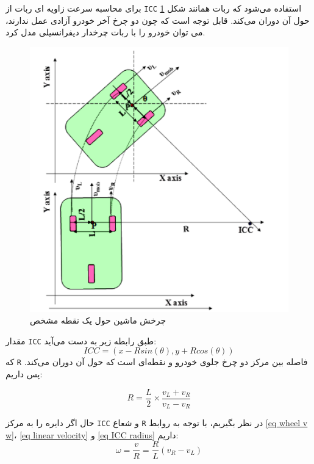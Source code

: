برای محاسبه سرعت زاویه ای ربات از \verb|ICC|  استفاده می‌شود که ربات همانند شکل \ref{Fig differential-robot-ICC} حول آن دوران می‌کند. قابل توجه است که چون دو چرخ آخر خودرو آزادی عمل ندارند، می توان خودرو را با ربات چرخدار دیفرانسیلی مدل کرد.
\begin{figure}[!h] 
	\centering
	\includegraphics[scale=0.28]{Images/differential-robot-ICC.png}
	\caption{چرخش ماشین حول یک نقطه مشخص} \label{Fig differential-robot-ICC}
\end{figure}

مقدار \verb|ICC| طبق رابطه زیر به دست می‌آید:
\begin{equation}
ICC = (x - Rsin(\theta), y + Rcos(\theta))
\end{equation}
 که \verb|R| فاصله بین مرکز دو چرخ جلوی خودرو و نقطه‌ای است که حول آن دوران می‌کند. پس داریم:
 
\begin{equation} \label{eq ICC radius}
R = \frac{L}{2} \times \frac{v_L + v_R}{v_L - v_R}
\end{equation}

حال اگر دایره را به مرکز \verb|ICC| و شعاع \verb|R| در نظر بگیریم، با توجه به روابط \ref{eq wheel v w}، \ref{eq linear velocity} و \ref{eq ICC radius} داریم:
\begin{equation} \label{eq forward kinematics w}
\omega = \frac{v}{R} = \frac{R}{L}(v_R - v_L)
\end{equation}

